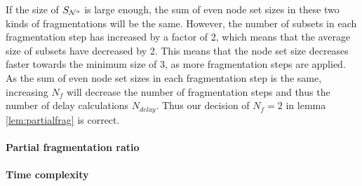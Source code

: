 If the size of $S_{\mathcal{N}^o}$ is large enough, the sum of even node set sizes in these two kinds of fragmentations will be the same. However, the number of subsets in each fragmentation step has increased by a factor of 2, which means that the average size of subsets have decreased by 2. This means that the node set size decreases faster towards the minimum size of 3, as more fragmentation steps are applied. As the sum of even node set sizes in each fragmentation step is the same, increasing $N_f$ will decrease the number of fragmentation steps and thus the number of delay calculations $N_{delay}$. Thus our decision of $N_f=2$ in lemma \ref{lem:partialfrag} is correct.

\paragraph{Partial fragmentation ratio}

\paragraph{Time complexity}